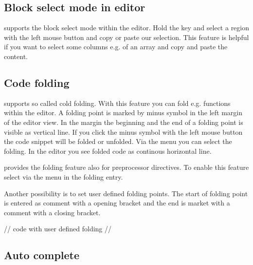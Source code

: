 
\subsection{Block select mode in editor}

\codeblocks supports the block select mode within the editor. Hold the key  and select a region with the left mouse button and copy or paste our selection. This feature is helpful if you want to select some columns e.g. of an array and copy and paste the content.


\subsection{Code folding}

\codeblocks supports so called cold folding. With this feature you can fold e.g. functions within the \codeblocks editor. A folding point is marked by minus symbol in the left margin of
the editor view. In the margin the beginning and the end of a folding point is visible as vertical line. If you click the minus symbol with the left mouse button the code snippet will be folded or unfolded. Via the menu  you can select the folding. In the editor you see folded code as continous horizontal line.


\codeblocks provides the folding feature also for preprocessor directives. To enable this feature select  via the menu  in the folding entry.

Another possibility is to set user defined folding points. The start of folding point is entered as comment with a opening bracket and the end is market with a comment with a closing bracket.

\begin{code}
//{
code with user defined folding
//}
\end{code}

\subsection{Auto complete}

